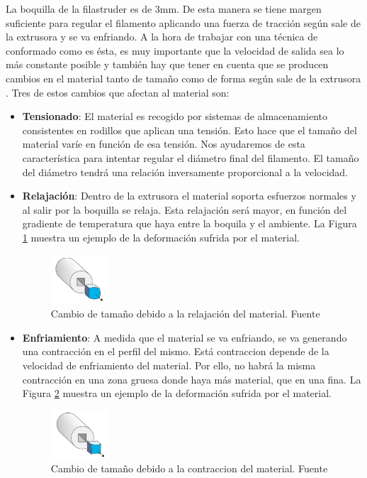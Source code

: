 La boquilla de la filastruder es de 3mm. De esta manera se tiene margen suficiente para regular el filamento aplicando una fuerza de tracción según sale de la extrusora y se va enfriando. A la hora de trabajar con una técnica de conformado como es ésta, es muy importante que la velocidad de salida sea lo más constante posible y también hay que tener en cuenta que se producen cambios en el material tanto de tamaño como de forma según sale de la extrusora \cite{tecno_polimeros}. Tres de estos cambios que afectan al material son: 

\begin{itemize}
	\item {\textbf{Tensionado}: El material es recogido por sistemas de almacenamiento consistentes en rodillos que aplican una tensión. Esto hace que el tamaño del material varíe en función de esa tensión. Nos ayudaremos de esta característica para intentar regular el diámetro final del filamento. El tamaño del diámetro tendrá una relación inversamente proporcional a la velocidad.}
	\item {\textbf{Relajación}: Dentro de la extrusora el material soporta esfuerzos normales y al salir por la boquilla se relaja. Esta relajación será mayor, en función del gradiente de temperatura que haya entre la boquila y el ambiente. La Figura \ref{fig:prod_relajacion} muestra un ejemplo de la deformación sufrida por el material.
		\begin{figure}[H]
	        \centering
	        \includegraphics[width=0.2\textwidth]{images/producciones/relajacion.png}
	        \caption[Cambio de tamaño debido a la relajación del material.]{Cambio de tamaño debido a la relajación del material. Fuente \cite{tecno_polimeros}}
	        \label{fig:prod_relajacion}
		\end{figure}
	}
	\item {\textbf{Enfriamiento}: A medida que el material se va enfriando, se va generando una contracción en el perfil del mismo. Está contraccion depende de la velocidad de enfriamiento del material. Por ello, no habrá la misma contracción en una zona gruesa donde haya más material, que en una fina. La Figura \ref{fig:prod_contraccion} muestra un ejemplo de la deformación sufrida por el material.
		\begin{figure}[H]
	        \centering
	        \includegraphics[width=0.2\textwidth]{images/producciones/contraccion.png}
	        \caption[Cambio de tamaño debido a la contraccion del material.]{Cambio de tamaño debido a la contraccion del material. Fuente \cite{tecno_polimeros}}
	        \label{fig:prod_contraccion}
		\end{figure}
	}
\end{itemize}

